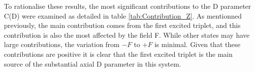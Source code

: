 \documentclass[10pt]{report}
\numberwithin{equation}{section}
\begin{document}
To rationalise these results, the most significant contributions to the D parameter C(D) were examined as detailed in table \ref{tab:Contribution_Z}.
As mentionned previously, the main contribution comes from the first excited triplet, and this contribution is also the most affected by the field F.
While other states may have large contributions, the variation from $-F$ to $+F$ is minimal. 
Given that these contributions are positive it is clear that the first excited triplet is the main source of the substantial axial D parameter in this system.


\begin{table}[h]
    \centering
\end{table}
\end{document}
